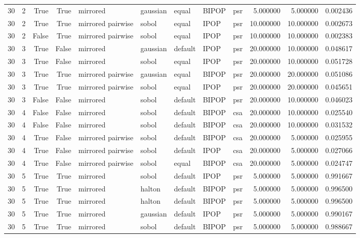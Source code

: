 \begin{tabular}{rrrrlllllrrr}
30 & 2 & True & True & mirrored & gaussian & equal & BIPOP & psr & 5.000000 & 5.000000 & 0.002436 \\
30 & 2 & True & True & mirrored pairwise & sobol & equal & IPOP & psr & 10.000000 & 10.000000 & 0.002673 \\
30 & 2 & False & True & mirrored pairwise & sobol & equal & IPOP & psr & 10.000000 & 10.000000 & 0.002383 \\
30 & 3 & True & False & mirrored & gaussian & default & IPOP & psr & 20.000000 & 10.000000 & 0.048617 \\
30 & 3 & True & False & mirrored & sobol & equal & IPOP & psr & 20.000000 & 10.000000 & 0.051728 \\
30 & 3 & True & True & mirrored pairwise & gaussian & equal & BIPOP & psr & 20.000000 & 20.000000 & 0.051086 \\
30 & 3 & True & True & mirrored pairwise & sobol & equal & IPOP & psr & 20.000000 & 20.000000 & 0.045651 \\
30 & 3 & False & False & mirrored & sobol & default & BIPOP & psr & 20.000000 & 10.000000 & 0.046023 \\
30 & 4 & False & False & mirrored & sobol & default & BIPOP & csa & 20.000000 & 10.000000 & 0.025540 \\
30 & 4 & False & False & mirrored & sobol & default & BIPOP & csa & 20.000000 & 10.000000 & 0.031532 \\
30 & 4 & True & False & mirrored pairwise & sobol & default & BIPOP & csa & 20.000000 & 5.000000 & 0.025955 \\
30 & 4 & True & False & mirrored pairwise & sobol & default & IPOP & csa & 20.000000 & 5.000000 & 0.027066 \\
30 & 4 & True & False & mirrored pairwise & sobol & equal & BIPOP & csa & 20.000000 & 5.000000 & 0.024747 \\
30 & 5 & True & True & mirrored & sobol & default & IPOP & psr & 5.000000 & 5.000000 & 0.991667 \\
30 & 5 & True & True & mirrored & halton & default & BIPOP & psr & 5.000000 & 5.000000 & 0.996500 \\
30 & 5 & True & True & mirrored & halton & default & BIPOP & psr & 5.000000 & 5.000000 & 0.996500 \\
30 & 5 & True & True & mirrored & gaussian & default & IPOP & psr & 5.000000 & 5.000000 & 0.990167 \\
30 & 5 & True & True & mirrored & sobol & default & BIPOP & psr & 5.000000 & 5.000000 & 0.988667 \\

\end{tabular}
